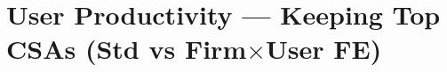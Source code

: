 \documentclass[11pt]{article}
\begin{document}
\section*{User Productivity — Keeping Top CSAs (Std vs Firm$\times$User FE)}

\end{document}
